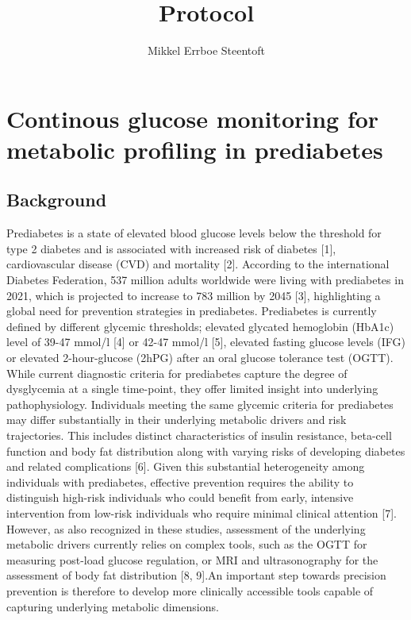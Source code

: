 \documentclass[
  12pt,
  letterpaper,
  DIV=11,
  numbers=noendperiod]{scrartcl}
\title{Protocol}
\author{Mikkel Errboe Steentoft}
\date{}
\begin{document}
\maketitle


\section{Continous glucose monitoring for metabolic profiling in
prediabetes}\label{continous-glucose-monitoring-for-metabolic-profiling-in-prediabetes}

\subsection{Background}\label{background}

Prediabetes is a state of elevated blood glucose levels below the
threshold for type 2 diabetes and is associated with increased risk of
diabetes {[}1{]}, cardiovascular disease (CVD) and mortality {[}2{]}.
According to the international Diabetes Federation, 537 million adults
worldwide were living with prediabetes in 2021, which is projected to
increase to 783 million by 2045 {[}3{]}, highlighting a global need for
prevention strategies in prediabetes. Prediabetes is currently defined
by different glycemic thresholds; elevated glycated hemoglobin (HbA1c)
level of 39-47 mmol/l {[}4{]} or 42-47 mmol/l {[}5{]}, elevated fasting
glucose levels (IFG) or elevated 2-hour-glucose (2hPG) after an oral
glucose tolerance test (OGTT). While current diagnostic criteria for
prediabetes capture the degree of dysglycemia at a single time-point,
they offer limited insight into underlying pathophysiology. Individuals
meeting the same glycemic criteria for prediabetes may differ
substantially in their underlying metabolic drivers and risk
trajectories. This includes distinct characteristics of insulin
resistance, beta-cell function and body fat distribution along with
varying risks of developing diabetes and related complications {[}6{]}.
Given this substantial heterogeneity among individuals with prediabetes,
effective prevention requires the ability to distinguish high-risk
individuals who could benefit from early, intensive intervention from
low-risk individuals who require minimal clinical attention {[}7{]}.
However, as also recognized in these studies, assessment of the
underlying metabolic drivers currently relies on complex tools, such as
the OGTT for measuring post-load glucose regulation, or MRI and
ultrasonography for the assessment of body fat distribution {[}8,
9{]}.An important step towards precision prevention is therefore to
develop more clinically accessible tools capable of capturing underlying
metabolic dimensions.
\end{document}
